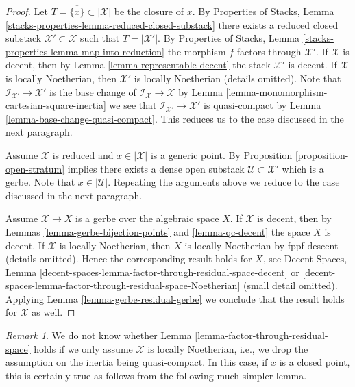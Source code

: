 \documentclass{stacks-project}
\theoremstyle{plain}
\theoremstyle{definition}
\theoremstyle{remark}
\newtheorem{remark}[subsection]{Remark}
\numberwithin{equation}{subsection}
\begin{document}
\begin{proof}
Let $T = \overline{\{x\}} \subset |\mathcal{X}|$ be the closure of $x$.
By Properties of Stacks, Lemma
\ref{stacks-properties-lemma-reduced-closed-substack}
there exists a reduced closed substack $\mathcal{X}' \subset \mathcal{X}$
such that $T = |\mathcal{X}'|$. By Properties of Stacks, Lemma
\ref{stacks-properties-lemma-map-into-reduction} the
morphism $f$ factors through $\mathcal{X}'$. If $\mathcal{X}$ is decent,
then by Lemma \ref{lemma-representable-decent} the stack
$\mathcal{X}'$ is decent. If $\mathcal{X}$ is locally Noetherian,
then $\mathcal{X}'$ is locally Noetherian (details omitted).
Note that $\mathcal{I}_{\mathcal{X}'} \to \mathcal{X}'$
is the base change of $\mathcal{I}_\mathcal{X} \to \mathcal{X}$ by
Lemma \ref{lemma-monomorphism-cartesian-square-inertia}
we see that $\mathcal{I}_{\mathcal{X}'} \to \mathcal{X}'$ is
quasi-compact by Lemma \ref{lemma-base-change-quasi-compact}.
This reduces us to the case discussed in the next paragraph.

\medskip\noindent
Assume $\mathcal{X}$ is reduced and $x \in |\mathcal{X}|$
is a generic point. By Proposition \ref{proposition-open-stratum}
implies there exists a dense open substack
$\mathcal{U} \subset \mathcal{X}'$ which is a gerbe.
Note that $x \in |\mathcal{U}|$.
Repeating the arguments above we reduce to the case discussed
in the next paragraph.

\medskip\noindent
Assume $\mathcal{X} \to X$ is a gerbe over the algebraic space $X$.
If $\mathcal{X}$ is decent, then by
Lemmas \ref{lemma-gerbe-bijection-points} and \ref{lemma-qc-decent}
the space $X$ is decent. If $\mathcal{X}$ is locally Noetherian,
then $X$ is locally Noetherian by fppf descent (details omitted).
Hence the corresponding result holds for $X$, see Decent Spaces, Lemma
\ref{decent-spaces-lemma-factor-through-residual-space-decent} or
\ref{decent-spaces-lemma-factor-through-residual-space-Noetherian}
(small detail omitted).
Applying Lemma \ref{lemma-gerbe-residual-gerbe} we conclude that the result
holds for $\mathcal{X}$ as well.
\end{proof}

\begin{remark}
\label{lemma-factor-through-residual-space-Noetherian}
We do not know whether Lemma \ref{lemma-factor-through-residual-space}
holds if we only assume $\mathcal{X}$ is locally Noetherian, i.e., we
drop the assumption on the inertia being quasi-compact. In this case,
if $x$ is a closed point, this is certainly true as follows from the
following much simpler lemma.
\end{remark}
\end{document}
